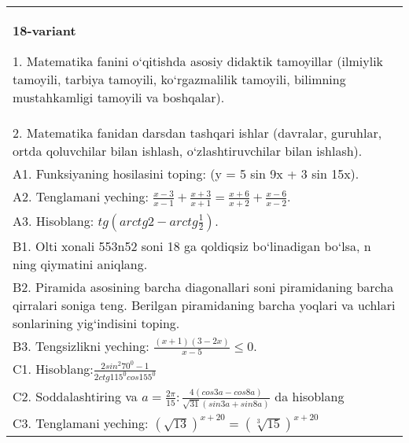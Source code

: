 \documentclass{article}
\begin{document}
\begin{tabular}{m{17cm}}
\textbf{18-variant}

1. Matematika fanini o‘qitishda asosiy didaktik tamoyillar (ilmiylik tamoyili, tarbiya tamoyili, ko‘rgazmalilik tamoyili, bilimning mustahkamligi tamoyili va boshqalar). \\
2. Matematika fanidan darsdan tashqari ishlar (davralar, guruhlar, ortda qoluvchilar bilan ishlash, o‘zlashtiruvchilar bilan ishlash). \\
A1. Funksiyaning hosilasini toping: (y = 5 sin 9x + 3 sin 15x). \\
A2. Tenglamani yeching: \(\frac{x - 3}{x - 1} + \frac{x + 3}{x + 1} = \frac{x + 6}{x + 2} + \frac{x - 6}{x - 2}\). \\
A3. Hisoblang: \(tg\left(arctg2 - arctg\frac{1}{2} \right) \). \\
B1. Olti xonali 553n52 soni 18 ga qoldiqsiz bo‘linadigan bo‘lsa, n ning qiymatini aniqlang. \\
B2. Piramida asosining barcha diagonallari soni piramidaning barcha qirralari soniga teng. Berilgan piramidaning barcha yoqlari va uchlari sonlarining yig‘indisini toping. \\
B3. Tengsizlikni yeching: \(\frac{ (x + 1) (3 - 2x) }{x - 5} \leq 0\). \\
C1. Hisoblang:\(\frac{2sin^{2}70^{0} - 1}{2ctg115^{0}cos155^{0}}\) \\
C2. Soddalashtiring va \(a = \frac{2\pi}{15}:\frac{4 (cos3a - cos8a) }{\sqrt{31} (sin3a + sin8a) }\) da hisoblang \\
C3. Tenglamani yeching: \((\sqrt{13}) ^{x + 20} = (\sqrt[3]{15}) ^{x + 20}\) \\

\end{tabular}
\vspace{1cm}
\end{document}
